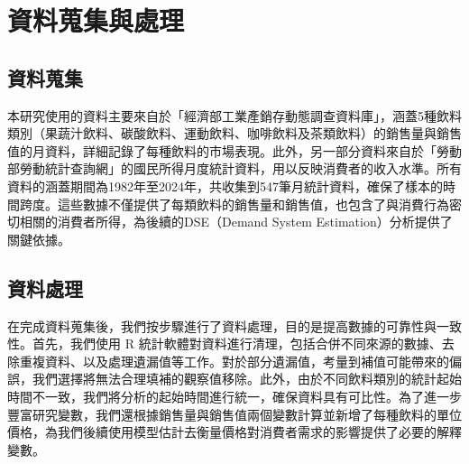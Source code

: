 
\section{資料蒐集與處理}
\subsection{資料蒐集}
本研究使用的資料主要來自於「經濟部工業產銷存動態調查資料庫」，涵蓋5種飲料類別（果蔬汁飲料、碳酸飲料、運動飲料、咖啡飲料及茶類飲料）的銷售量與銷售值的月資料，詳細記錄了每種飲料的市場表現。此外，另一部分資料來自於「勞動部勞動統計查詢網」的國民所得月度統計資料，用以反映消費者的收入水準。所有資料的涵蓋期間為1982年至2024年，共收集到547筆月統計資料，確保了樣本的時間跨度。這些數據不僅提供了每類飲料的銷售量和銷售值，也包含了與消費行為密切相關的消費者所得，為後續的DSE（Demand System Estimation）分析提供了關鍵依據。

\subsection{資料處理}
在完成資料蒐集後，我們按步驟進行了資料處理，目的是提高數據的可靠性與一致性。首先，我們使用 R 統計軟體對資料進行清理，包括合併不同來源的數據、去除重複資料、以及處理遺漏值等工作。對於部分遺漏值，考量到補值可能帶來的偏誤，我們選擇將無法合理填補的觀察值移除。此外，由於不同飲料類別的統計起始時間不一致，我們將分析的起始時間進行統一，確保資料具有可比性。為了進一步豐富研究變數，我們還根據銷售量與銷售值兩個變數計算並新增了每種飲料的單位價格，為我們後續使用模型估計去衡量價格對消費者需求的影響提供了必要的解釋變數。